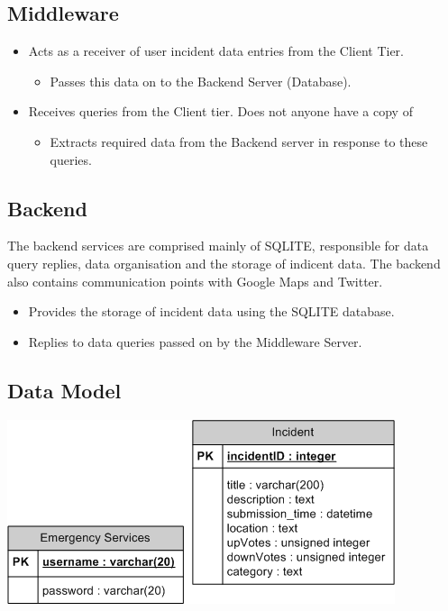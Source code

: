 \documentclass{sig-alt-release2}
\begin{document}
\subsection{Middleware}

\begin{itemize}
\item    Acts as a receiver of user incident data entries from the Client Tier.
  \begin{itemize}
  \item        Passes this data on to the Backend Server (Database).
  \end{itemize}
\item    Receives queries from the Client tier. Does not anyone have a copy of 
  \begin{itemize}
  \item        Extracts required data from the Backend server in response to these queries.
  \end{itemize}
\end{itemize}

\subsection{Backend}

The backend services are comprised mainly of SQLITE, responsible for data query replies, data organisation and the storage of indicent data. The backend also contains communication points with Google Maps and Twitter.

\begin{itemize}
\item    Provides the storage of incident data using the SQLITE database.
\item    Replies to data queries passed on by the Middleware Server.
\end{itemize}

\subsection{Data Model}

\begin{center}
  \includegraphics[scale=0.5]{img/4.png}
\end{center}
\end{document}
